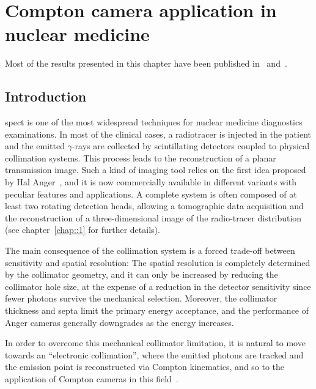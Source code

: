 \chapter{Compton camera application in nuclear medicine}\label{chap::5}


Most of the results presented in this chapter have been published in~\parencite{Fontana2017_PMB} and~\parencite{Fontana2017_APPB}.

\vfill

\minitoc

\newpage

\glsresetall
{} 

\section{Introduction}\label{chap5::sec::intro}

\gls{spect} is one of the most widespread techniques for nuclear medicine diagnostics examinations. In most of the clinical cases, a radiotracer is injected in the patient and the emitted $\gamma$-rays are collected by scintillating detectors coupled to physical collimation systems. This process leads to the reconstruction of a planar transmission image. Such a kind of imaging tool relies on the first idea proposed by Hal Anger~\parencite{Anger1958, Anger1964}, and it is now commercially available in different variants with peculiar features and applications. A complete system is often composed of at least two rotating detection heads, allowing a tomographic data acquisition and the reconstruction of a three-dimensional image of the radio-tracer distribution (see chapter~\ref{chap::1} for further details).

The main consequence of the collimation system is a forced trade-off between sensitivity and spatial resolution: The spatial resolution is completely determined by the collimator geometry, and it can only be increased by reducing the collimator hole size, at the expense of a reduction in the detector sensitivity since fewer photons survive the mechanical selection. Moreover, the collimator thickness and septa limit the primary energy acceptance, and the performance of Anger cameras generally downgrades as the energy increases.  

In order to overcome this mechanical collimator limitation, it is natural to move towards an \enquote{electronic collimation}, where the emitted photons are tracked and the emission point is reconstructed via Compton kinematics, and so to the application of Compton cameras in this field~\parencite{Everett1977, Singh1983}.

